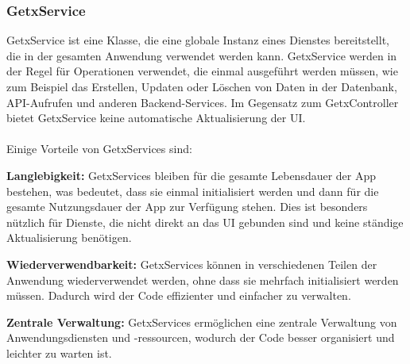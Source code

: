 \subsubsection{GetxService}
GetxService ist eine Klasse, die eine globale Instanz eines Dienstes bereitstellt, die in der gesamten Anwendung verwendet werden kann. GetxService werden in der Regel für Operationen verwendet, die einmal ausgeführt werden müssen, wie zum Beispiel das Erstellen, Updaten oder Löschen von Daten in der Datenbank, API-Aufrufen und anderen Backend-Services. Im Gegensatz zum GetxController bietet GetxService keine automatische Aktualisierung der UI.
\\\\
Einige Vorteile von GetxServices sind:

\textbf{Langlebigkeit:}
GetxServices bleiben für die gesamte Lebensdauer der App bestehen, was bedeutet, dass sie einmal initialisiert werden und dann für die gesamte Nutzungsdauer der App zur Verfügung stehen. Dies ist besonders nützlich für Dienste, die nicht direkt an das UI gebunden sind und keine ständige Aktualisierung benötigen.

\textbf{Wiederverwendbarkeit:}
GetxServices können in verschiedenen Teilen der Anwendung wiederverwendet werden, ohne dass sie mehrfach initialisiert werden müssen. Dadurch wird der Code effizienter und einfacher zu verwalten.

\textbf{Zentrale Verwaltung:}
GetxServices ermöglichen eine zentrale Verwaltung von Anwendungsdiensten und -ressourcen, wodurch der Code besser organisiert und leichter zu warten ist.

